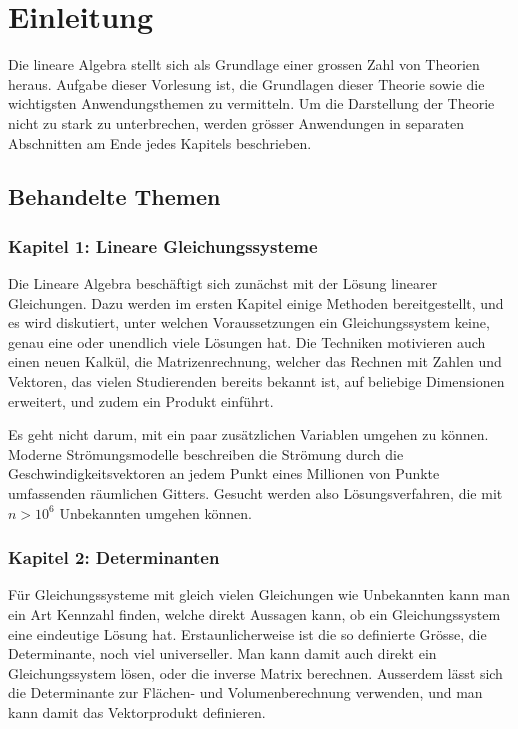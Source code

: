 %
%
%
\chapter*{Einleitung}

Die lineare Algebra stellt sich als Grundlage einer grossen
Zahl von Theorien heraus.
Aufgabe dieser Vorlesung ist, die
Grundlagen dieser Theorie sowie die wichtigsten Anwendungsthemen
zu vermitteln.
Um die Darstellung der Theorie nicht zu stark zu unterbrechen,
werden grösser Anwendungen in separaten Abschnitten am Ende
jedes Kapitels beschrieben.

\section*{Behandelte Themen}
\subsection*{Kapitel 1: Lineare Gleichungssysteme}
Die Lineare Algebra beschäftigt sich zunächst mit der Lösung linearer
Gleichungen.
Dazu werden im ersten Kapitel einige Methoden bereitgestellt,
und es wird diskutiert, unter welchen Voraussetzungen ein
Gleichungssystem keine, genau eine oder unendlich viele
Lösungen hat.
Die Techniken motivieren auch einen neuen Kalkül, die Matrizenrechnung,
welcher das Rechnen mit Zahlen und Vektoren, das vielen
Studierenden bereits bekannt ist, auf beliebige Dimensionen erweitert,
und zudem ein Produkt einführt.

Es geht nicht darum, mit ein paar zusätzlichen Variablen umgehen
zu können.
Moderne Strömungsmodelle beschreiben die Strömung durch die
Geschwindigkeitsvektoren an jedem Punkt eines Millionen von Punkte
umfassenden räumlichen Gitters.
Gesucht werden also Lösungsverfahren, die mit $n>10^6$ Unbekannten
umgehen können.

\subsection*{Kapitel 2: Determinanten}
Für Gleichungssysteme mit gleich vielen Gleichungen wie Unbekannten
kann man ein Art Kennzahl finden, welche direkt Aussagen kann,
ob ein Gleichungssystem eine eindeutige Lösung hat.
Erstaunlicherweise ist die so definierte Grösse, die Determinante,
noch viel universeller.
Man kann damit auch direkt ein Gleichungssystem lösen, oder
die inverse Matrix berechnen.
Ausserdem lässt sich die Determinante zur Flächen- und Volumenberechnung
verwenden, und man kann damit das Vektorprodukt definieren.

